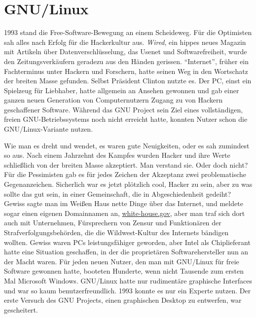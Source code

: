 \chapter{GNU/Linux}

1993 stand die Free-Software-Bewegung an einem Scheideweg. Für die Optimisten sah alles nach Erfolg für die Hackerkultur aus. \textit{Wired}, ein hippes neues Magazin mit Artikeln über Datenverschlüsselung, das Usenet und Softwarefreiheit, wurde den Zeitungsverkäufern geradezu aus den Händen gerissen. "`Internet"', früher ein Fachterminus unter Hackern und Forschern, hatte seinen Weg in den Wortschatz der breiten Masse gefunden. Selbst Präsident Clinton nutzte es. Der PC, einst ein Spielzeug für Liebhaber, hatte allgemein an Ansehen gewonnen und gab einer ganzen neuen Generation von Computernutzern Zugang zu von Hackern geschaffener Software. Während das GNU Project sein Ziel eines vollständigen, freien GNU-Betriebssystems noch nicht erreicht hatte, konnten Nutzer schon die GNU/Linux-Variante nutzen.

Wie man es dreht und wendet, es waren gute Neuigkeiten, oder es sah zumindest so aus. Nach einem Jahrzehnt des Kampfes wurden Hacker und ihre Werte schließlich von der breiten Masse akzeptiert. Man verstand sie. Oder doch nicht? Für die Pessimisten gab es für jedes Zeichen der Akzeptanz zwei problematische Gegenanzeichen. Sicherlich war es jetzt plötzlich cool, Hacker zu sein, aber zu was sollte das gut sein, in einer Gemeinschaft, die in Abgeschiedenheit gedeiht? Gewiss sagte man im Weißen Haus nette Dinge über das Internet, und meldete sogar einen eigenen Domainnamen an, \href{http://whitehouse.gov}{white-house.gov}, aber man traf sich dort auch mit Unternehmen, Fürsprechern von Zensur und Funktionären der Strafverfolgungsbehörden, die die Wildwest-Kultur des Internets bändigen wollten. Gewiss waren PCs leistungsfähiger geworden, aber Intel als Chiplieferant hatte eine Situation geschaffen, in der die proprietären Softwarehersteller nun an der Macht waren. Für jeden neuen Nutzer, den man mit GNU/Linux für freie Software gewonnen hatte, booteten Hunderte, wenn nicht Tausende zum ersten Mal Microsoft Windows. GNU/Linux hatte nur rudimentäre graphische Interfaces und war so kaum benutzerfreundlich. 1993 konnte es nur ein Experte nutzen. Der erste Versuch des GNU Projects, einen graphischen Desktop zu entwerfen, war gescheitert.


